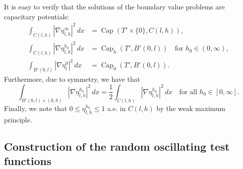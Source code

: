 \documentclass{article}
\numberwithin{equation}{section}
\theoremstyle{definition}
\theoremstyle{remark}
\newcommand{\cpct}{\operatorname{Cap}}
\begin{document}
It is easy to verify that the solutions of the boundary value problems are capacitary potentials:
\begin{equation} \label{eq:capacitary_potentials}
    \begin{aligned}
        \int_{C(l, h)} |\nabla \eta_{l, h}^\infty|^2 \, dx &= \cpct(T' \times \{0\}, C(l, h)), \\
        \int_{C(l, h)} |\nabla \eta_{l, h}^{h_0}|^2 \, dx &= \cpct_h(T', B'(0, l)) \quad \text{for } h_0 \in (0, \infty), \\
        \int_{B'(0, l)} |\nabla \eta_l^0|^2 \, dx &= \cpct_0(T', B'(0, l)).
    \end{aligned}
\end{equation}
Furthermore, due to symmetry, we have that
\begin{equation} \label{eq:symmetry_considerations}
    \int_{B'(0, l) \times (0, h)} |\nabla \eta_{l, h}^{h_0}|^2 \, dx = \frac{1}{2} \int_{C(l, h)} |\nabla \eta_{l, h}^{h_0}|^2 \, dx \quad \text{for all } h_0 \in [0, \infty].
\end{equation}
Finally, we note that $0 \le \eta_{l, h}^{h_0} \le 1$ a.e. in $C(l, h)$ by the weak maximum principle.


\subsection{Construction of the random oscillating test functions} \label{ssec:otf_construction}
\end{document}
